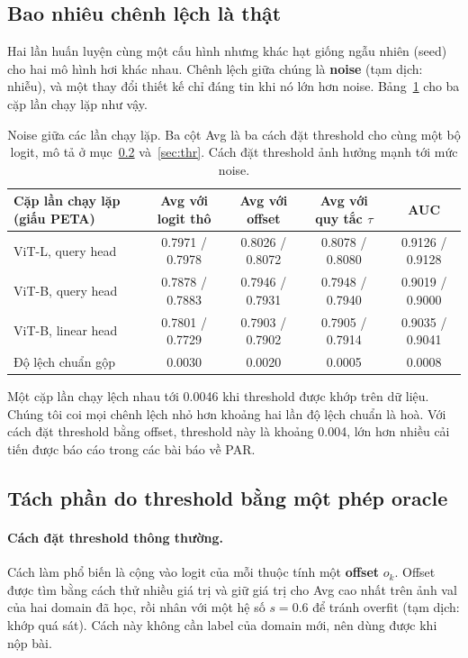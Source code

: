 \documentclass[11pt,a4paper]{article}
\begin{document}
\subsection{Bao nhiêu chênh lệch là thật}

Hai lần huấn luyện cùng một cấu hình nhưng khác hạt giống ngẫu nhiên (seed) cho hai mô hình hơi khác nhau. Chênh lệch giữa chúng là \textbf{noise} (tạm dịch: nhiễu), và một thay đổi thiết kế chỉ đáng tin khi nó lớn hơn noise. Bảng~\ref{tab:noise} cho ba cặp lần chạy lặp như vậy.

\begin{table}[H]
\centering\small
\begin{tabular}{@{}lcccc@{}}
\toprule
Cặp lần chạy lặp (giấu PETA) & Avg với logit thô & Avg với offset & Avg với quy tắc $\tau$ & AUC \\
\midrule
ViT-L, query head & 0.7971 / 0.7978 & 0.8026 / 0.8072 & 0.8078 / 0.8080 & 0.9126 / 0.9128 \\
ViT-B, query head & 0.7878 / 0.7883 & 0.7946 / 0.7931 & 0.7948 / 0.7940 & 0.9019 / 0.9000 \\
ViT-B, linear head & 0.7801 / 0.7729 & 0.7903 / 0.7902 & 0.7905 / 0.7914 & 0.9035 / 0.9041 \\
\midrule
Độ lệch chuẩn gộp & 0.0030 & 0.0020 & 0.0005 & 0.0008 \\
\bottomrule
\end{tabular}
\caption{Noise giữa các lần chạy lặp. Ba cột Avg là ba cách đặt threshold cho cùng một bộ logit, mô tả ở mục~\ref{sec:offset} và~\ref{sec:thr}. Cách đặt threshold ảnh hưởng mạnh tới mức noise.}
\label{tab:noise}
\end{table}

Một cặp lần chạy lệch nhau tới 0.0046 khi threshold được khớp trên dữ liệu. Chúng tôi coi mọi chênh lệch nhỏ hơn khoảng hai lần độ lệch chuẩn là hoà. Với cách đặt threshold bằng offset, threshold này là khoảng 0.004, lớn hơn nhiều cải tiến được báo cáo trong các bài báo về PAR.

\subsection{Tách phần do threshold bằng một phép oracle}
\label{sec:offset}

\paragraph{Cách đặt threshold thông thường.} Cách làm phổ biến là cộng vào logit của mỗi thuộc tính một \textbf{offset} $o_k$. Offset được tìm bằng cách thử nhiều giá trị và giữ giá trị cho Avg cao nhất trên ảnh val của hai domain đã học, rồi nhân với một hệ số $s=0.6$ để tránh overfit (tạm dịch: khớp quá sát). Cách này không cần label của domain mới, nên dùng được khi nộp bài.
\end{document}
